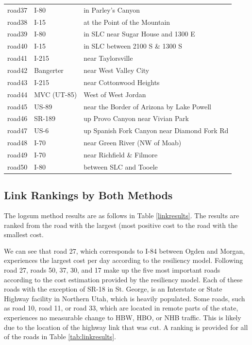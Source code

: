 \begin{table}
\begin{tabular}[t]{lll}
road37 & I-80 & in Parley's Canyon\\
road38 & I-15 & at the Point of the Mountain\\
road39 & I-80 & in SLC near Sugar House and 1300 E\\
\addlinespace
road40 & I-15 & in SLC between 2100 S \& 1300 S\\
road41 & I-215 & near Taylorsville\\
road42 & Bangerter & near West Valley City\\
road43 & I-215 & near Cottonwood Heights\\
road44 & MVC (UT-85) & West of West Jordan\\
\addlinespace
road45 & US-89 & near the Border of Arizona by Lake Powell\\
road46 & SR-189 & up Provo Canyon near Vivian Park\\
road47 & US-6 & up Spanish Fork Canyon near Diamond Fork Rd\\
road48 & I-70 & near Green River (NW of Moab)\\
road49 & I-70 & near Richfield \& Filmore\\
\addlinespace
road50 & I-80 & between SLC and Tooele\\
\bottomrule
\end{tabular}
\end{table}

\subsection{Link Rankings by Both Methods}
The logsum method results are as follows in Table \ref{linkresults}.
The results are ranked from the road with the largest (most positive
cost to the road with the smallest cost.

We can see that road 27, which corresponds to I-84 between Ogden and Morgan, experiences the largest cost per day according to the resiliency model. Following road 27, roads 50, 37, 30, and 17 make up the five most important roads according to the cost estimation provided by the resiliency model. Each of these roads with the exception of SR-18 in St. George, is an Interstate or State Highway facility in Northern Utah, which is heavily populated. Some roads, such as road 10, road 11, or road 33, which are located in remote parts of the state, experiences no measurable change to HBW, HBO, or NHB traffic. This is likely due to the location of the highway link that was cut. A ranking is provided for all of the roads in Table \ref{tab:linkresults}.

